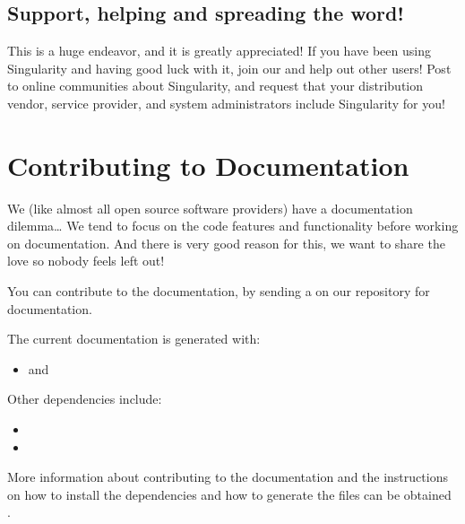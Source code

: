 \documentclass[letterpaper,10pt,english]{sphinxmanual}
\begin{document}
\subsection{Support, helping and spreading the word!}
\label{\detokenize{contributing:support-helping-and-spreading-the-word}}
This is a huge endeavor, and it is greatly appreciated! If you have been using Singularity and having good luck with it, join our  and help out other users! Post to online communities about Singularity, and request that your distribution vendor, service provider, and system administrators include Singularity for you!


\section{Contributing to Documentation}
\label{\detokenize{contributing:contributing-to-documentation}}
We (like almost all open source software providers) have a documentation dilemma… We tend to focus on the code features and functionality before working on documentation. And there is very good reason for this, we want to share the love so nobody feels left out!

You can contribute to the documentation, by sending a  on our repository for documentation.

The current documentation is generated with:
\begin{itemize}
\item {} 
 and 

\end{itemize}

Other dependencies include:
\begin{itemize}
\item {} 

\item {} 

\end{itemize}

More information about contributing to the documentation and the instructions on how to install the dependencies and how to generate the files can be obtained .
\end{document}
